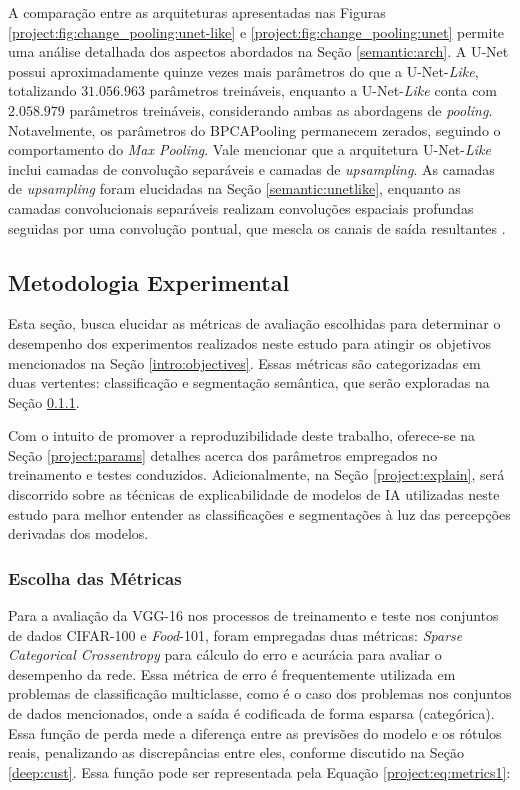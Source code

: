 A comparação entre as arquiteturas apresentadas nas Figuras \ref{project:fig:change_pooling:unet-like} e \ref{project:fig:change_pooling:unet} permite uma análise detalhada dos aspectos abordados na Seção \ref{semantic:arch}. A U-Net possui aproximadamente quinze vezes mais parâmetros do que a U-Net-\textit{Like}, totalizando $31.056.963$ parâmetros treináveis, enquanto a U-Net-\textit{Like} conta com $2.058.979$ parâmetros treináveis, considerando ambas as abordagens de \textit{pooling}. Notavelmente, os parâmetros do BPCAPooling permanecem zerados, seguindo o comportamento do \textit{Max Pooling}. Vale mencionar que a arquitetura U-Net-\textit{Like} inclui camadas de convolução separáveis e camadas de \textit{upsampling}. As camadas de \textit{upsampling} foram elucidadas na Seção \ref{semantic:unetlike}, enquanto as camadas convolucionais separáveis realizam convoluções espaciais profundas seguidas por uma convolução pontual, que mescla os canais de saída resultantes \citep{Zhao2018AutomaticFPGA}.


\subsection{Metodologia Experimental}
\label{project:exp_result}
Esta seção, busca elucidar as métricas de avaliação escolhidas para determinar o desempenho dos experimentos realizados neste estudo para atingir os objetivos mencionados na Seção \ref{intro:objectives}. Essas métricas são categorizadas em duas vertentes: classificação e segmentação semântica, que serão exploradas na Seção \ref{project:metrics}.

Com o intuito de promover a reproduzibilidade deste trabalho, oferece-se na Seção \ref{project:params} detalhes acerca dos parâmetros empregados no treinamento e testes conduzidos. Adicionalmente, na Seção \ref{project:explain}, será discorrido sobre as técnicas de explicabilidade de modelos de IA utilizadas neste estudo para melhor entender as classificações e segmentações à luz das percepções derivadas dos modelos.

\subsubsection{Escolha das Métricas}
\label{project:metrics}
Para a avaliação da VGG-16 nos processos de treinamento e teste nos conjuntos de dados CIFAR-100 e \textit{Food}-101, foram empregadas duas métricas: \textit{Sparse Categorical Crossentropy} para cálculo do erro e acurácia para avaliar o desempenho da rede. Essa métrica de erro é frequentemente utilizada em problemas de classificação multiclasse, como é o caso dos problemas nos conjuntos de dados mencionados, onde a saída é codificada de forma esparsa (categórica). Essa função de perda mede a diferença entre as previsões do modelo e os rótulos reais, penalizando as discrepâncias entre eles, conforme discutido na Seção \ref{deep:cust}. Essa função pode ser representada pela Equação \ref{project:eq:metrics1}:

